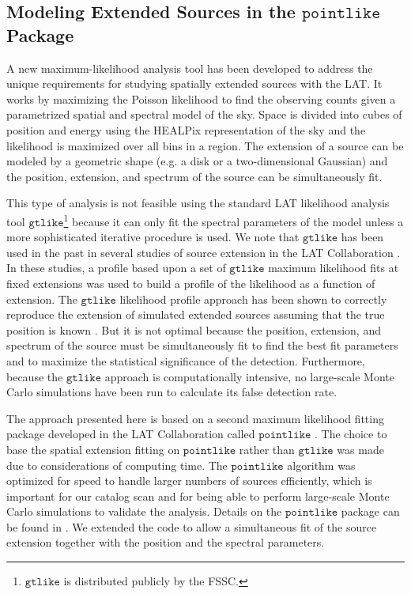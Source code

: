 \documentclass[12pt,preprint]{aastex}
\newcommand{\gtlike}{\ensuremath{\mathtt{gtlike}}\xspace}
\newcommand{\pointlike}{\ensuremath{\mathtt{pointlike}}\xspace}
\begin{document}
\subsection{Modeling Extended Sources in the \pointlike Package}

A new maximum-likelihood analysis tool has been developed to address the
unique requirements for studying spatially extended sources with the LAT.
It works by maximizing the Poisson likelihood to find the observing counts
given a parametrized spatial and spectral model of the sky.  
Space is
divided into cubes of position and energy using the HEALPix representation of
the sky \citep{healpix} and the likelihood is maximized over all bins in
a region.
The extension of a source can be modeled by a geometric shape
(e.g. a disk or a two-dimensional Gaussian) and the position, extension,
and spectrum of the source can be simultaneously fit.

This type of analysis is not feasible using the standard LAT likelihood
analysis tool \gtlike\footnote{\gtlike is distributed publicly by the
FSSC.} because it can only fit the spectral parameters of the model
unless a more sophisticated iterative procedure is used.  
We note that \gtlike has been used in the
past in several studies of source extension in the LAT Collaboration
\citep{lmc,smc,w28,w51c}.  In these studies, a profile based upon a
set of \gtlike maximum likelihood fits at fixed extensions was used
to build a profile of the likelihood as a function of extension.
The \gtlike likelihood profile approach has been shown to correctly
reproduce the extension of simulated extended sources assuming that the
true position is known \citep{francesco_2011}.  But it is not optimal
because the position, extension, and spectrum of the source must be
simultaneously fit to find the best fit parameters and to maximize the
statistical significance of the detection.  Furthermore, because the \gtlike
approach is computationally intensive, no large-scale Monte Carlo
simulations have been run to calculate its false detection rate.

The approach presented here is based on a second maximum likelihood
fitting package developed in the LAT Collaboration called \pointlike
\citep{first_cat,matthew_kerr_thesis}.  The choice to base the
spatial extension fitting on \pointlike rather than \gtlike was made
due to considerations of computing time.  The \pointlike algorithm was
optimized for speed to handle larger numbers of sources efficiently,
which is important for our catalog scan and for being able
to perform large-scale Monte Carlo simulations to validate the analysis.
Details on the \pointlike package can be
found in \cite{matthew_kerr_thesis}.  We extended the code to allow a
simultaneous fit of the source extension together with the position and
the spectral parameters.
\end{document}
